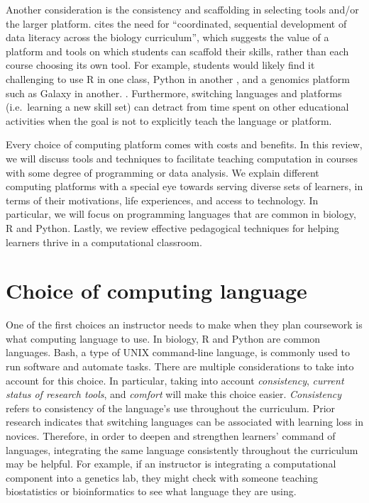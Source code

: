Another consideration is the consistency and scaffolding in selecting tools and/or the larger platform.
\citet{Gibson18} cites the need for ``coordinated, sequential development of data literacy across the biology curriculum'',
which suggests the value of a platform and tools on which students can scaffold their skills,
rather than each course choosing its own tool.
For example, students would likely find it challenging to use R in one class,
Python in another \citep{wu1990}, and a genomics platform such as Galaxy in another.
  . Furthermore, switching languages and platforms (i.e.\ learning a new skill set)
can detract from time spent on other educational activities when the goal is not to explicitly teach the language or platform.

Every choice of computing platform comes with costs and benefits. 
In this review, we will discuss tools and techniques to facilitate teaching computation in courses with some degree of programming or data analysis.
We explain different computing platforms with a special eye towards serving diverse sets of learners, 
in terms of their motivations, life experiences, and access to technology.
In particular, we will focus on programming languages that are common in biology, R and Python. 
Lastly, we review effective pedagogical techniques for helping learners thrive in a computational classroom.

\section{Choice of computing language}

One of the first choices an instructor needs to make when they plan coursework is what computing language to use.
In biology, R and Python are common languages.
Bash, a type of UNIX command-line language, is commonly used to run software and automate tasks.
There are multiple considerations to take into account for this choice.
In particular, taking into account \textit{consistency}, \textit{current status of research tools}, and \textit{comfort} will make this choice easier.
\textit{Consistency} refers to consistency of the language's use throughout the curriculum.
Prior research \cite{wu1990} indicates that switching languages can be associated with learning loss in novices.
Therefore, in order to deepen and strengthen learners' command of languages, integrating the same language consistently throughout the curriculum may be helpful.
For example, if an instructor is integrating a computational component into a genetics lab, they might check with someone teaching biostatistics or bioinformatics to see what language they are using.



